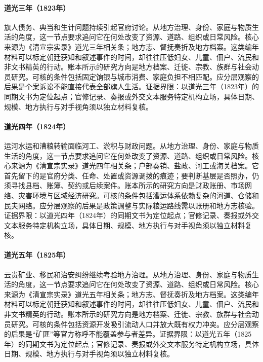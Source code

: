 \hypertarget{social:EQ-1823-BANNER-DEBT}{}\paragraph{道光三年（1823年）}旗人债务、典当和生计问题持续引起官府讨论。从地方治理、身份、家庭与物质生活的角度，这一节点要求追问它在何处改变了资源、道路、组织或日常风险。核心来源为《清宣宗实录》道光三年相关条；地方志、督抚奏折及地方档案。这类编年材料可以标定朝廷获知和叙述事件的时间，却往往压低妇女、儿童、佃户、流民和非文书精英的行动。账本所示的研究方向是地方档案、迁徙、宗教、族群与社会动员研究。可核的条件包括固定饷银与城市消费、家庭负担不相匹配。应分层观察的后果是个案诉讼不能直接代表全部旗人生活。证据界限：以道光三年（1823年）的同期文书为定位起点；官修记录、奏报或外交文本服务特定机构立场，具体日期、规模、地方执行与对手视角须以独立材料复核。
\hypertarget{social:EQ-1824-GRAND-CANAL-CRISIS}{}\paragraph{道光四年（1824年）}运河水运和漕粮转输面临河工、淤积与财政问题。从地方治理、身份、家庭与物质生活的角度，这一节点要求追问它在何处改变了资源、道路、组织或日常风险。核心来源为《清宣宗实录》道光四年相关条；户部奏销、盐政、河工或海关档案。它首先留下的是官府分类、任命、处置或资源调拨的痕迹；要判断基层是否照办，仍须寻找县档、账簿、契约或后续案件。账本所示的研究方向是财政账册、市场网络、灾害环境与区域经济研究。可核的条件包括漕运体系依赖复杂的河道、仓储和民夫网络。应分层观察的后果是政策调整与实际粮运路线需以账册和地方志核验。证据界限：以道光四年（1824年）的同期文书为定位起点；官修记录、奏报或外交文本服务特定机构立场，具体日期、规模、地方执行与对手视角须以独立材料复核。
\hypertarget{social:EQ-1825-SOUTHWEST-MINING-UNREST}{}\paragraph{道光五年（1825年）}云贵矿业、移民和治安纠纷继续考验地方治理。从地方治理、身份、家庭与物质生活的角度，这一节点要求追问它在何处改变了资源、道路、组织或日常风险。核心来源为《清宣宗实录》道光五年相关条；地方志、督抚奏折及地方档案。这类编年材料可以标定朝廷获知和叙述事件的时间，却往往压低妇女、儿童、佃户、流民和非文书精英的行动。账本所示的研究方向是地方档案、迁徙、宗教、族群与社会动员研究。可核的条件包括资源开发吸引流动人口并放大既有权力冲突。应分层观察的后果是“矿匪”等官方称呼不能覆盖参与者差异。证据界限：以道光五年（1825年）的同期文书为定位起点；官修记录、奏报或外交文本服务特定机构立场，具体日期、规模、地方执行与对手视角须以独立材料复核。
